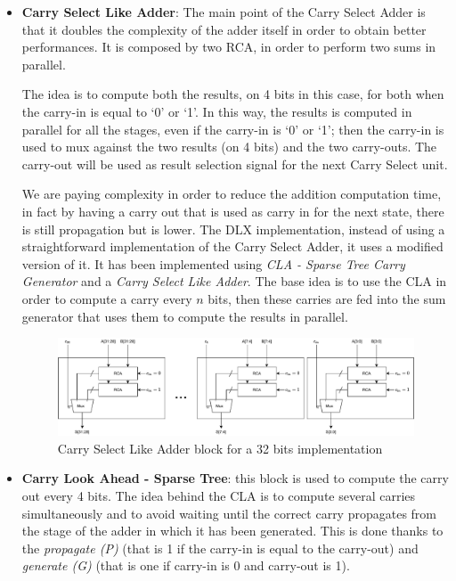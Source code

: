 \begin{itemize} 
	\item \textbf{Carry Select Like Adder}: The main point of the Carry Select Adder is that it doubles the complexity of the adder itself in order to obtain better performances. It is composed by two RCA, in order to perform two sums in parallel.
	
	The idea is to compute both the results, on 4 bits in this case, for both when the carry-in is equal to `0' or `1'. In this way, the results is computed in parallel for all the stages, even if the carry-in is `0' or `1'; then the carry-in is used to mux against the two results (on 4 bits) and the two carry-outs. The carry-out will be used as result selection signal for the next Carry Select unit.
	
	We are paying complexity in order to reduce the addition computation time, in fact by having a carry out that is used as carry in for the next state, there is still propagation but is lower.\newline\newline	
	The DLX implementation, instead of using a straightforward implementation of the Carry Select Adder, it uses a modified version of it. It has been implemented using \textit{CLA - Sparse Tree Carry Generator} and a \textit{Carry Select Like Adder}. The base idea is to use the CLA in order to compute a carry every $n$ bits, then these carries are fed into the sum generator that uses them to compute the results in parallel.
	\begin{figure}[H]
		\centering
		\includegraphics[width=1\textwidth]{chapters/5_ExecuteStage/images/carry_sum.pdf}
		\caption{Carry Select Like Adder block for a 32 bits implementation}
		\label{fig:carry_sum}
	\end{figure}
	\item \textbf{Carry Look Ahead - Sparse Tree}: this block is used to compute the carry out every 4 bits. The idea behind the CLA is to compute several carries simultaneously and to avoid waiting until the correct carry propagates from the stage of the adder in which it has been generated. This is done thanks to the \textit{propagate (P)} (that is 1 if the carry-in is equal to the carry-out) and \textit{generate (G)} (that is one if carry-in is 0 and carry-out is 1).

\end{itemize}
